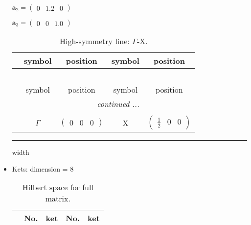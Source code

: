 \documentclass[fleqn,10pt,landscape]{article}
\begin{document}
\begin{itemize}
\quad $\bm{a}_2=\begin{pmatrix} 0 & 1.2 & 0 \end{pmatrix}$

\quad $\bm{a}_3=\begin{pmatrix} 0 & 0 & 1.0 \end{pmatrix}$

\begin{center}
\renewcommand{\arraystretch}{1.3}
\begin{longtable}{c|cc|cc}
\caption{High-symmetry line: $\Gamma$-X.}
 \\
 \hline \hline
 & symbol & position & symbol & position \\ \hline \endfirsthead

\multicolumn{4}{l}{\tablename\ \thetable{}} \\
 \hline \hline
 & symbol & position & symbol & position \\ \hline \endhead

 \hline \hline
\multicolumn{4}{r}{\footnotesize\it continued ...} \\ \endfoot

 \hline \hline
\multicolumn{4}{r}{} \\ \endlastfoot

 & $\Gamma$ & $\begin{pmatrix} 0 & 0 & 0 \end{pmatrix}$ & X & $\begin{pmatrix} \frac{1}{2} & 0 & 0 \end{pmatrix}$ \\
\end{longtable}
\end{center}

 \hfil \hrule height 1mm width \textwidth \hfil

\item Kets: dimension = 8
\begin{center}
\renewcommand{\arraystretch}{1.3}
\begin{longtable}{c|cc|cc}
\caption{Hilbert space for full matrix.}
 \\
 \hline \hline
 & No. & ket & No. & ket \\ \hline \endfirsthead


\end{longtable}
\end{center}
\end{itemize}
\end{document}
